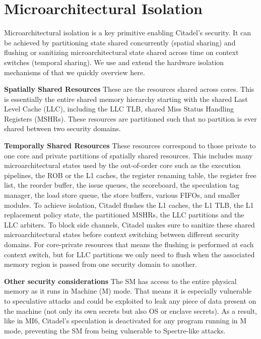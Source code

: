 \section{Microarchitectural Isolation}
\label{sec:hardwaremechanisms}

Microarchitectural isolation is a key primitive enabling Citadel's security.
It can be achieved by partitioning state shared concurrently (spatial sharing) and flushing or sanitizing microarchitectural state shared across time on context switches (temporal sharing).
We use and extend the hardware isolation mechanisms of \cite{bourgeat2019mi6} that we quickly overview here.

\textbf{Spatially Shared Resources}
\label{sec:mi6detailsspacial}
These are the resources shared across cores.
This is essentially the entire shared memory hierarchy starting with the shared Last Level Cache (LLC), including the LLC TLB,  shared Miss Status Handling Registers (MSHRs).
These resources are partitioned such that no partition is ever shared between two security domains.

\textbf{Temporally Shared Resources}
These resources correspond to those private to one core and private partitions of spatially shared resources.
This includes many microarchitectural states used by the out-of-order core such as the execution pipelines, the ROB or the L1 caches, the register renaming table, the register free list, the reorder buffer, the issue queues, the scoreboard, the speculation tag manager, the load store queue, the store buffers, various FIFOs, and smaller modules.
To achieve isolation, Citadel flushes the L1 caches, the L1 TLB, the L1 replacement policy state, the partitioned MSHRs, the LLC partitions and the LLC arbiters.
To block side channels, Citadel makes sure to sanitize these shared microarchitectural states before context switching between different security domains.
For core-private resources that means the flushing is performed at each context switch, but for LLC partitions we only need to flush when the associated memory region is passed from one security domain to another.

\textbf{Other security considerations}
The SM has access to the entire physical memory as it runs in Machine (M) mode.
That means it is especially vulnerable to speculative attacks and could be exploited to leak any piece of data present on the machine (not only its own secrets but also OS or enclave secrets).
As a result, like in MI6, Citadel's speculation is deactivated for any program running in M mode, preventing the SM from being vulnerable to Spectre-like attacks.